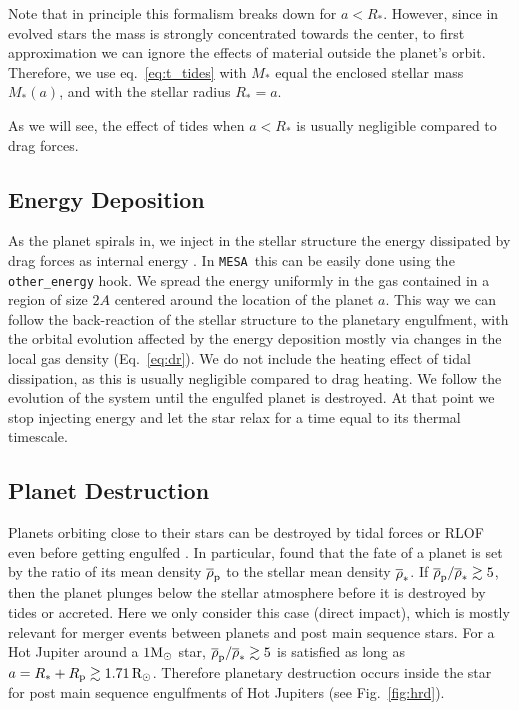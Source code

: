 \documentclass[twocolumn]{aastex62}
\newcommand{\code}[1]{\texttt{#1}}
\newcommand{\mesa}{\code{MESA}}
\newcommand{\MESA}{\mesa}
\newcommand{\mso}{\ensuremath{{\rm M}_\odot}}
\newcommand{\rso}{\ensuremath{{\rm R}_\odot}}
\begin{document}
Note that in principle this formalism breaks down for $a<R_*$. However, since in evolved stars the mass is strongly concentrated towards the center, to first approximation we can ignore the effects of material outside the planet's orbit. Therefore, we use eq.~\ref{eq:t_tides} with $M_*$ equal the enclosed stellar mass $M_*(a)$, and with the stellar radius $R_* = a$.

As we will see, the effect of tides when $a<R_*$ is usually negligible compared to drag forces.



\subsection{Energy Deposition}
As the planet spirals in, we inject in the stellar structure the energy dissipated by drag forces as internal energy \citep[e.g.][]{Taam:1978,Clayton:2017,Fragos:2019}. In \MESA\ this can be easily done using the \code{other\_energy} hook. We spread the energy uniformly  in the gas contained in a region of size $2A$ centered around the location of the planet $a$. This way we can follow the back-reaction of the stellar structure to the planetary engulfment, with the orbital evolution affected by the energy deposition mostly via changes in the local gas density (Eq.~\ref{eq:dr}). We do not include the heating effect of tidal dissipation, as this is usually negligible compared to drag heating. 
We follow the evolution of the system until the engulfed planet is destroyed. At that point we stop injecting energy and let the star relax for a time equal to its thermal timescale. 



\subsection{Planet Destruction}\label{sec:disruption}
Planets orbiting close to their stars can be destroyed by tidal forces or RLOF even before getting engulfed \citep[e.g.][]{Metzger_2012}. In particular, \citet{Metzger_2012} found that the fate of a planet is set by the ratio of its mean density $\overline{\rho}_{\rm p}$ to the stellar mean density $\overline{\rho}_{\rm *}$. If $\overline{\rho}_{\rm p}/\overline{\rho}_{\rm *} \gtrsim 5$, then the planet plunges below the stellar atmosphere before it is destroyed by tides or accreted.  
Here we only consider this case (direct impact), which is mostly relevant for merger events between planets and  post main sequence stars. For a Hot Jupiter around a $1\mso$ star, $\overline{\rho}_{\rm p}/\overline{\rho}_{\rm *} \gtrsim 5$ is satisfied as long as $a = R_* + R_{\rm p} \gtrsim 1.71\, \rso$. Therefore planetary destruction occurs inside the star for  post main sequence engulfments  of Hot Jupiters (see Fig.~\ref{fig:hrd}). 
\end{document}
